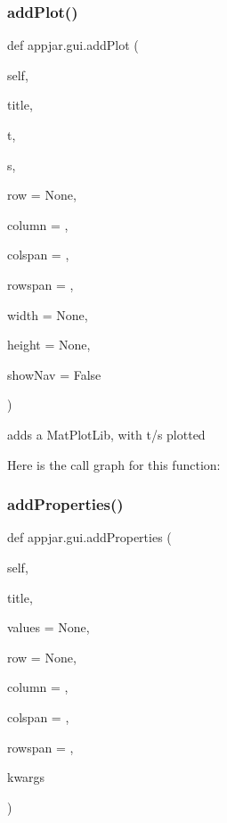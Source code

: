 \subsubsection{\texorpdfstring{add\+Plot()}{addPlot()}}
{\footnotesize\ttfamily def appjar.\+gui.\+add\+Plot (\begin{DoxyParamCaption}\item[{}]{self,  }\item[{}]{title,  }\item[{}]{t,  }\item[{}]{s,  }\item[{}]{row = {\ttfamily None},  }\item[{}]{column = {},  }\item[{}]{colspan = {},  }\item[{}]{rowspan = {},  }\item[{}]{width = {\ttfamily None},  }\item[{}]{height = {\ttfamily None},  }\item[{}]{show\+Nav = {\ttfamily False} }\end{DoxyParamCaption})}

\begin{DoxyVerb}adds a MatPlotLib, with t/s plotted \end{DoxyVerb}
 Here is the call graph for this function\+:
\mbox{\label{classappjar_1_1gui_aec43701849ab6ad0bae5a379ee5bffa5}} 
\subsubsection{\texorpdfstring{add\+Properties()}{addProperties()}}
{\footnotesize\ttfamily def appjar.\+gui.\+add\+Properties (\begin{DoxyParamCaption}\item[{}]{self,  }\item[{}]{title,  }\item[{}]{values = {\ttfamily None},  }\item[{}]{row = {\ttfamily None},  }\item[{}]{column = {},  }\item[{}]{colspan = {},  }\item[{}]{rowspan = {},  }\item[{}]{kwargs }\end{DoxyParamCaption})}

